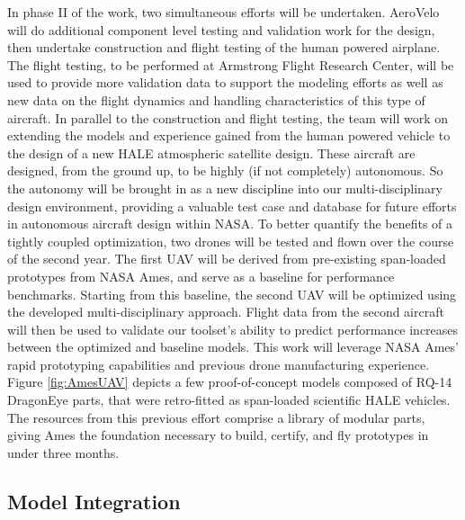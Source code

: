 \documentclass[]{aiaa-tc}
\begin{document}
    In phase II of the work, two simultaneous efforts will be undertaken. AeroVelo will do additional component level testing 
    and validation work for the design, then undertake construction and flight testing of the human powered airplane. 
    The flight testing, to be performed at Armstrong Flight Research Center, will be used to provide more validation 
    data to support the modeling efforts as well as new data on the flight dynamics and handling characteristics of
    this type of aircraft. In parallel to the construction and flight testing, the team will work on extending the 
    models and experience gained from the human powered vehicle to the design of a new HALE atmospheric satellite 
    design. These aircraft are designed, from the ground up, to be highly (if not completely) autonomous.  
    So the autonomy will be brought in as a new discipline into our multi-disciplinary design environment, 
    providing a valuable test case and database for future efforts in autonomous aircraft design within NASA. 
    To better quantify the benefits of a tightly coupled optimization,
    two drones will be tested and flown over the course of the second year. The first UAV will be derived from
    pre-existing span-loaded prototypes from NASA Ames, and serve as a baseline for performance benchmarks.
    Starting from this baseline, the second UAV will be optimized using the developed multi-disciplinary approach.
    Flight data from the second aircraft will then be used to validate our toolset's ability to predict
    performance increases between the optimized and baseline models.
    This work will leverage NASA Ames' rapid prototyping capabilities and previous drone manufacturing experience.
    Figure \ref{fig:AmesUAV} depicts a few proof-of-concept models composed of RQ-14 DragonEye parts, that were retro-fitted
    as span-loaded scientific HALE vehicles. The resources from this previous effort comprise a library of modular parts,
    giving Ames the foundation necessary to build, certify, and fly prototypes in under three months.

  


    \subsection{Model Integration}
\end{document}
